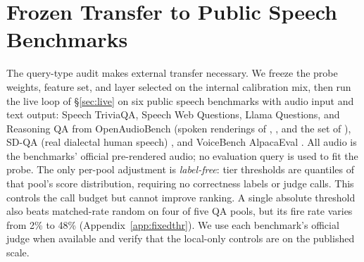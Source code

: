 \section{Frozen Transfer to Public Speech Benchmarks}
\label{sec:transfer}
\label{sec:transfer-neg}

The query-type audit makes external transfer necessary. We freeze the
probe weights, feature set, and layer selected on the internal
calibration mix, then run the live loop of \S\ref{sec:live} on six
public speech benchmarks with audio input and text output: Speech
TriviaQA, Speech Web Questions, Llama Questions, and Reasoning QA from
OpenAudioBench \citep{openaudiobench2025} (spoken renderings of
\citealp{joshi2017triviaqa}, \citealp{berant2013webquestions}, and the
set of \citealp{nachmani2024spoken}), SD-QA (real dialectal human
speech) \citep{faisal2021sdqa}, and VoiceBench AlpacaEval
\citep{chen2024voicebench,taori2023alpaca}. All audio is the
benchmarks' official pre-rendered audio; no evaluation query is used to
fit the probe. The only per-pool adjustment is \emph{label-free}: tier
thresholds are quantiles of that pool's score distribution, requiring
no correctness labels or judge calls. This controls the call budget but
cannot improve ranking. A single absolute threshold also beats
matched-rate random on four of five QA pools, but its fire rate varies
from 2\% to 48\% (Appendix~\ref{app:fixedthr}). We use each benchmark's
official judge when available and verify that the local-only controls
are on the published scale.

